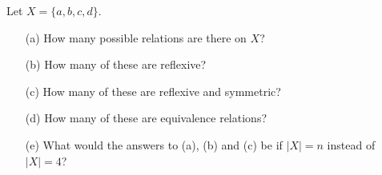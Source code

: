     \begin{exercise}
        Let \( X = \{a, b, c, d\} \).
        \begin{enumerate}
            \item[(a)] How many possible relations are there on \( X \)?
            \item[(b)] How many of these are reflexive?
            \item[(c)] How many of these are reflexive and symmetric?
            \item[(d)] How many of these are equivalence relations?
            \item[(e)] What would the answers to (a), (b) and (c) be if \( |X| = n \) instead of \( |X| = 4 \)?
        \end{enumerate}

    \end{exercise}    
